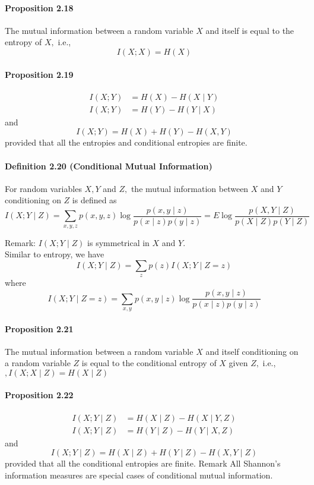 \documentclass[8pt]{article}
\begin{document}
\paragraph{Proposition 2.18} The mutual information between a random variable $X$ and itself is equal to the entropy of $X,$ i.e., $$I(X ; X)=H(X)$$
\paragraph{Proposition 2.19}
$$
\begin{aligned}
I(X ; Y) &=H(X)-H(X \mid Y) \\
I(X ; Y) &=H(Y)-H(Y \mid X)
\end{aligned}
$$
and
$$
I(X ; Y)=H(X)+H(Y)-H(X, Y)
$$
provided that all the entropies and conditional entropies are finite.

\begin{tcolorbox}
\paragraph{Definition 2.20 (Conditional Mutual Information)} For random variables $X, Y$ and $Z,$ the mutual information between $X$ and $Y$ conditioning on $Z$ is defined as
$$
I(X ; Y \mid Z)=\sum_{x, y, z} p(x, y, z) \log \frac{p(x, y \mid z)}{p(x \mid z) p(y \mid z)}=E \log \frac{p(X, Y \mid Z)}{p(X \mid Z) p(Y \mid Z)}
$$
\end{tcolorbox}
Remark: $I(X ; Y \mid Z)$ is symmetrical in $X$ and $Y$.\\
Similar to entropy, we have
$$
I(X ; Y \mid Z)=\sum_{z} p(z) I(X ; Y \mid Z=z)
$$
where
$$
I(X ; Y \mid Z=z)=\sum_{x, y} p(x, y \mid z) \log \frac{p(x, y \mid z)}{p(x \mid z) p(y \mid z)}
$$

\paragraph{Proposition 2.21} The mutual information between a random variable $X$ and itself conditioning on a random variable $Z$ is equal to the conditional entropy of $X$ given $Z,$ i.e., $, I(X ; X \mid Z)=H(X \mid Z)$
\paragraph{Proposition 2.22}
$$
\begin{aligned}
I(X ; Y \mid Z) &=H(X \mid Z)-H(X \mid Y, Z) \\
I(X ; Y \mid Z) &=H(Y \mid Z)-H(Y \mid X, Z)
\end{aligned}
$$
and
$$
I(X ; Y \mid Z)=H(X \mid Z)+H(Y \mid Z)-H(X, Y \mid Z)
$$
provided that all the conditional entropies are finite.
Remark All Shannon's information measures are special cases of conditional mutual information.
\end{document}
